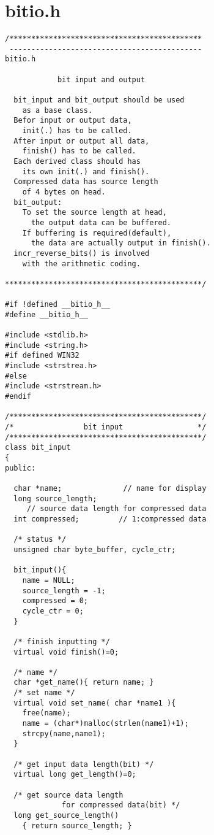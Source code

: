 \section{bitio.h}
\begin{verbatim}
/********************************************
 --------------------------------------------
bitio.h

            bit input and output

  bit_input and bit_output should be used
    as a base class.
  Befor input or output data,
    init(.) has to be called.
  After input or output all data,
    finish() has to be called.
  Each derived class should has
    its own init(.) and finish().
  Compressed data has source length
    of 4 bytes on head.
  bit_output:
    To set the source length at head,
      the output data can be buffered.
    If buffering is required(default),
      the data are actually output in finish().
  incr_reverse_bits() is involved
    with the arithmetic coding.

*********************************************/

#if !defined __bitio_h__
#define __bitio_h__

#include <stdlib.h>
#include <string.h>
#if defined WIN32
#include <strstrea.h>
#else
#include <strstream.h>
#endif

/********************************************/
/*                bit input                 */
/********************************************/
class bit_input
{
public:

  char *name;              // name for display
  long source_length;
     // source data length for compressed data
  int compressed;         // 1:compressed data

  /* status */
  unsigned char byte_buffer, cycle_ctr;

  bit_input(){
    name = NULL;
    source_length = -1;
    compressed = 0;
    cycle_ctr = 0;
  }

  /* finish inputting */
  virtual void finish()=0;

  /* name */
  char *get_name(){ return name; }
  /* set name */
  virtual void set_name( char *name1 ){
    free(name);
    name = (char*)malloc(strlen(name1)+1);
    strcpy(name,name1);
  }

  /* get input data length(bit) */
  virtual long get_length()=0;

  /* get source data length
             for compressed data(bit) */
  long get_source_length()
    { return source_length; }


\end{verbatim}
